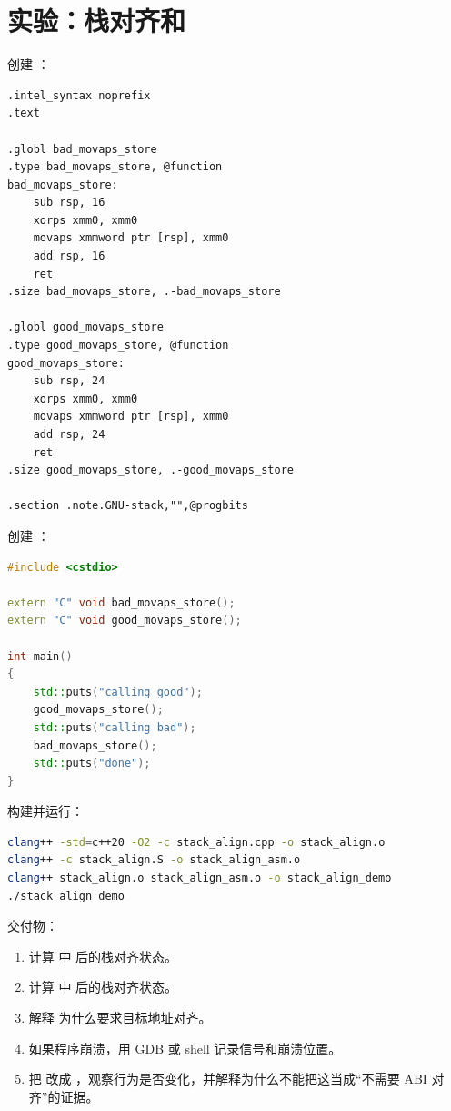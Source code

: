 \section{实验：栈对齐和 }

\begin{labbox}
创建 ：

\begin{lstlisting}
.intel_syntax noprefix
.text

.globl bad_movaps_store
.type bad_movaps_store, @function
bad_movaps_store:
    sub rsp, 16
    xorps xmm0, xmm0
    movaps xmmword ptr [rsp], xmm0
    add rsp, 16
    ret
.size bad_movaps_store, .-bad_movaps_store

.globl good_movaps_store
.type good_movaps_store, @function
good_movaps_store:
    sub rsp, 24
    xorps xmm0, xmm0
    movaps xmmword ptr [rsp], xmm0
    add rsp, 24
    ret
.size good_movaps_store, .-good_movaps_store

.section .note.GNU-stack,"",@progbits
\end{lstlisting}

创建 ：

\begin{lstlisting}[language=C++]
#include <cstdio>

extern "C" void bad_movaps_store();
extern "C" void good_movaps_store();

int main()
{
    std::puts("calling good");
    good_movaps_store();
    std::puts("calling bad");
    bad_movaps_store();
    std::puts("done");
}
\end{lstlisting}

构建并运行：

\begin{lstlisting}[language=bash]
clang++ -std=c++20 -O2 -c stack_align.cpp -o stack_align.o
clang++ -c stack_align.S -o stack_align_asm.o
clang++ stack_align.o stack_align_asm.o -o stack_align_demo
./stack_align_demo
\end{lstlisting}

交付物：

\begin{enumerate}
  \item 计算  中  后的栈对齐状态。
  \item 计算  中  后的栈对齐状态。
  \item 解释  为什么要求目标地址对齐。
  \item 如果程序崩溃，用 GDB 或 shell 记录信号和崩溃位置。
  \item 把  改成 ，观察行为是否变化，并解释为什么不能把这当成“不需要 ABI 对齐”的证据。
\end{enumerate}
\end{labbox}


